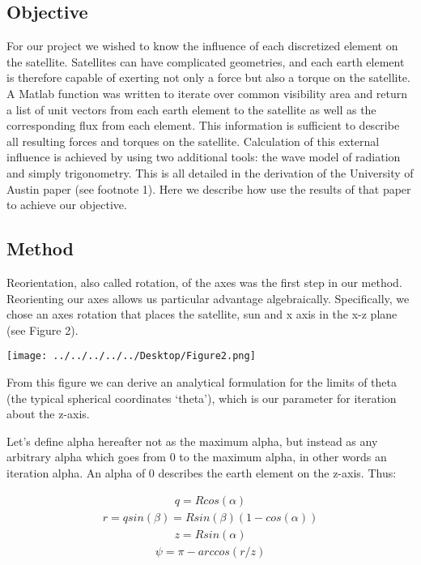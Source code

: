 \documentclass[12pt]{article}
\begin{document}
\subsection*{Objective}
For our project we wished to know the influence of each discretized element on the satellite. Satellites can have complicated geometries, and each earth element is therefore capable of exerting not only a force but also a torque on the satellite.
	A Matlab function was written to iterate over common visibility area and return a list of unit vectors from each earth element to the satellite as well as the corresponding flux from each element. This information is sufficient to describe all resulting forces and torques on the satellite.	Calculation of this external influence is achieved by using two additional tools: the wave model of radiation and simply trigonometry. This is all detailed in the derivation of the University of Austin paper (see footnote 1). Here we describe how use the results of that paper to achieve our objective.
	\subsection*{Method}
	Reorientation, also called rotation, of the axes was the first step in our method. Reorienting our axes allows us particular advantage algebraically. Specifically, we chose an axes rotation that places the satellite, sun and x axis in the x-z plane (see Figure 2).
	
\texttt{[image: ../../../../../Desktop/Figure2.png]}

From this figure we can derive an analytical formulation for the limits of theta (the typical spherical coordinates `theta'), which is our parameter for iteration about the z-axis.

Let's define alpha hereafter not as the maximum alpha, but instead as any arbitrary alpha which goes from 0 to the maximum alpha, in other words an iteration alpha. An alpha of 0 describes the earth element on the z-axis. Thus:

\begin{align*}
q=Rcos(\alpha)
\end{align*}
\begin{align*}
r=qsin(\beta)=Rsin(\beta)(1-cos(\alpha))
\end{align*}
\begin{align*}
z=Rsin(\alpha)
\end{align*}
\begin{align*}
\psi=\pi-arccos(r/z)
\end{align*}
\end{document}
